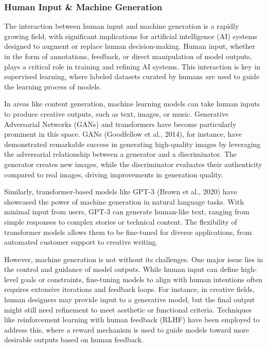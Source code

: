 \documentclass{article} %
\begin{document}
\subsubsection{Human Input \& Machine Generation}

The interaction between human input and machine generation is a rapidly growing field, with significant implications for artificial intelligence (AI) systems designed to augment or replace human decision-making. Human input, whether in the form of annotations, feedback, or direct manipulation of model outputs, plays a critical role in training and refining AI systems. This interaction is key in supervised learning, where labeled datasets curated by humans are used to guide the learning process of models.

In areas like content generation, machine learning models can take human inputs to produce creative outputs, such as text, images, or music. Generative Adversarial Networks (GANs) and transformers have become particularly prominent in this space. GANs (Goodfellow et al., 2014), for instance, have demonstrated remarkable success in generating high-quality images by leveraging the adversarial relationship between a generator and a discriminator. The generator creates new images, while the discriminator evaluates their authenticity compared to real images, driving improvements in generation quality.

Similarly, transformer-based models like GPT-3 (Brown et al., 2020) have showcased the power of machine generation in natural language tasks. With minimal input from users, GPT-3 can generate human-like text, ranging from simple responses to complex stories or technical content. The flexibility of transformer models allows them to be fine-tuned for diverse applications, from automated customer support to creative writing.

However, machine generation is not without its challenges. One major issue lies in the control and guidance of model outputs. While human input can define high-level goals or constraints, fine-tuning models to align with human intentions often requires extensive iterations and feedback loops. For instance, in creative fields, human designers may provide input to a generative model, but the final output might still need refinement to meet aesthetic or functional criteria. Techniques like reinforcement learning with human feedback (RLHF) have been employed to address this, where a reward mechanism is used to guide models toward more desirable outputs based on human feedback.
\end{document}
